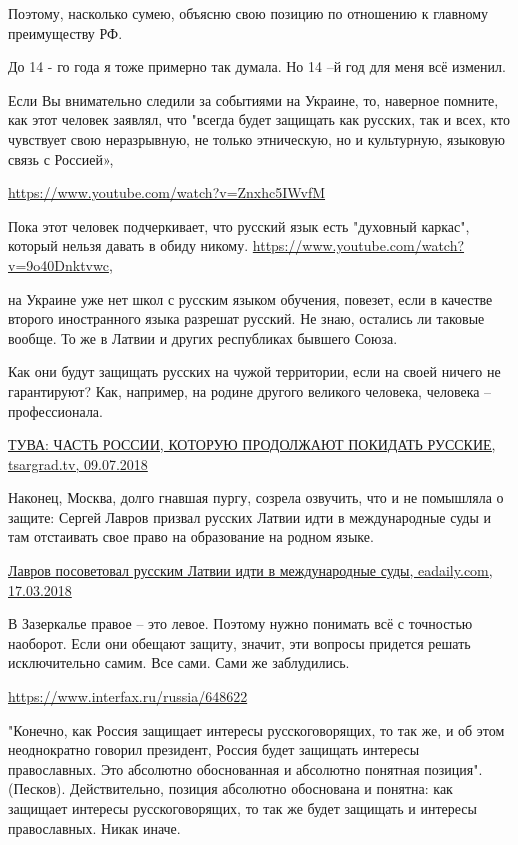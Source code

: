 \begin{itemize}
\begin{itemize}
Поэтому, насколько сумею, объясню свою позицию по отношению к главному преимуществу РФ.

До 14 - го года я тоже примерно так думала. Но 14 –й год для меня всё изменил.

Если Вы внимательно следили за событиями на Украине, то, наверное помните, как
этот человек заявлял, что "всегда будет защищать как русских, так и всех, кто
чувствует свою неразрывную, не только этническую, но и культурную, языковую
связь с Россией», 

\url{https://www.youtube.com/watch?v=Znxhc5IWvfM}

Пока этот человек подчеркивает, что русский язык есть "духовный каркас",
который нельзя давать в обиду никому.
\url{https://www.youtube.com/watch?v=9o40Dnktvwc},

на Украине уже нет школ с русским языком обучения, повезет, если в качестве
второго иностранного языка разрешат русский. Не знаю, остались ли таковые
вообще. То же в Латвии и других республиках бывшего Союза.

Как они будут защищать русских на чужой территории, если на своей ничего не
гарантируют? Как, например, на родине другого великого человека, человека –
профессионала. 

\href{https://tsargrad.tv/articles/tuva-chast-rossii-kotoruju-prodolzhajut-pokidat-russkie_145103}{%
ТУВА: ЧАСТЬ РОССИИ, КОТОРУЮ ПРОДОЛЖАЮТ ПОКИДАТЬ РУССКИЕ, tsargrad.tv, 09.07.2018%
}

Наконец, Москва, долго гнавшая пургу, созрела озвучить, что и не помышляла о защите:
Сергей Лавров призвал русских Латвии идти в международные суды и там отстаивать свое право на образование на родном языке. 

\href{https://eadaily.com/ru/news/2018/03/17/lavrov-posovetoval-russkim-latvii-idti-v-mezhdunarodnye-sudy}{%
Лавров посоветовал русским Латвии идти в международные суды, eadaily.com, 17.03.2018%
}

В Зазеркалье правое – это левое. Поэтому нужно понимать всё с точностью
наоборот. Если они обещают защиту, значит, эти вопросы придется решать
исключительно самим. Все сами. Сами же заблудились.

\url{https://www.interfax.ru/russia/648622}

"Конечно, как Россия защищает интересы русскоговорящих, то так же, и об этом
неоднократно говорил президент, Россия будет защищать интересы православных.
Это абсолютно обоснованная и абсолютно понятная позиция". (Песков).
Действительно, позиция абсолютно обоснована и понятна: как защищает интересы
русскоговорящих, то так же будет защищать и интересы православных. Никак иначе.


\end{itemize}
\end{itemize}

